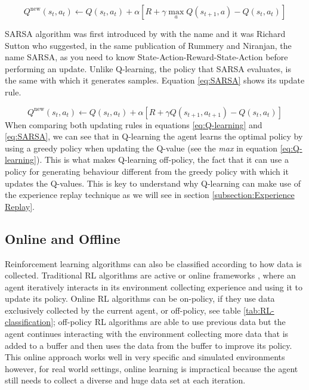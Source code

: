 \begin{equation}
Q^{\text{new}}(s_t, a_t)  \leftarrow Q(s_t, a_t) + \alpha \left[ R  + \gamma {\max_{a} Q(s_{t+1}, a)} - Q(s_t, a_t)\right]
\label{eq:Q-learning}
\end{equation}


SARSA algorithm was first introduced by \cite{Rummery+Niranjan:1994} with the name  and it was Richard Sutton who suggested, in the same publication of Rummery and Niranjan, the name SARSA, as you need to know State-Action-Reward-State-Action before performing an update.  Unlike Q-learning, the policy that SARSA evaluates, is the same with which it generates samples. Equation \ref{eq:SARSA} shows its update rule.

\begin{equation}
Q^{\text{new}}(s_t, a_t)  \leftarrow Q(s_t, a_t) + \alpha \left[R+ \gamma  Q(s_{t+1}, a_{t+1}) - Q(s_t, a_t)\right]
\label{eq:SARSA}
\end{equation}
When comparing both updating rules in equations \ref{eq:Q-learning} and \ref{eq:SARSA}, we can see that in Q-learning the agent learns the optimal policy by using a greedy policy when updating the Q-value (see the \textit{max} in equation \ref{eq:Q-learning}). This is what makes Q-learning off-policy, the fact that it can use a policy for generating behaviour different from the greedy policy with which it updates the Q-values. This is key to understand why Q-learning can make use of the experience replay technique as we will see in section \ref{subsection:Experience Replay}.



\subsection{Online and Offline} 
\label{subsection:Online and Offline}

Reinforcement learning algorithms can also be classified according to how data is collected. Traditional RL algorithms are active or online frameworks \cite{youtube_offline_RL}, where an agent iteratively interacts in its environment collecting experience and using it to update its policy. Online RL algorithms can be on-policy, if  they use data exclusively collected by the current agent, or off-policy, see table \ref{tab:RL-classification}; off-policy RL algorithms are able to use previous data but the agent continues interacting with the environment collecting more data that is added to a buffer and then uses the data from the buffer to improve its policy. This online approach works well in very specific and  simulated environments however, for real world settings, online learning is impractical because the agent still needs to collect a diverse and huge data set at each iteration. 

